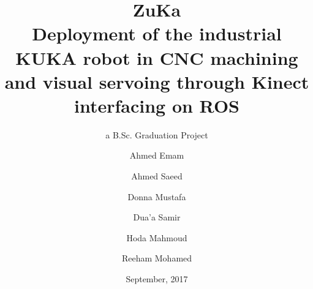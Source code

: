 \titlehead{\centering\texttt{[image: myFrontMatter/figures/zuLogo]}
    \texttt{[image: myFrontMatter/figures/engLogo]}}

\subject{Zagazig University, Faculty of Engineering, Mechatronics Program}

\title{ZuKa\\{\Large Deployment of the industrial KUKA robot in CNC machining and visual servoing through Kinect interfacing on ROS}}

\subtitle{a B.Sc. Graduation Project}
\author{
Ahmed Emam
\and{Ahmed Saeed}
\and{Donna Mustafa}
\and{Dua’a Samir}
\and{Hoda Mahmoud}
\and{Reeham Mohamed}
}


%
%




\publishers{Submitted to The Mechatronics Program, Faculty of Engineering, Zagazig University, Egypt}
\date{September, 2017}

\uppertitleback{Graduation Project Report to be submitted to\\
Zagazig University, faculty of Engineering\\
in partial fulfillment of the requirements for the degree \\
Bachelor of Science in Engineering (B.Sc.)\\
}



